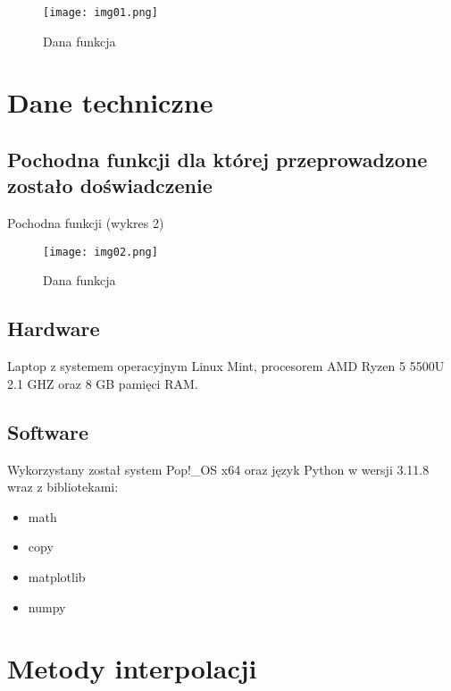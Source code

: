 \documentclass{article}
\begin{document}
\begin{figure}[H]
  \centering
  \begin{minipage}[b]{0.3\textwidth}
    \texttt{[image: img01.png]}
    \caption{Dana funkcja}
  \end{minipage}
\end{figure}

\section{Dane techniczne}

\subsection{Pochodna funkcji dla której przeprowadzone zostało doświadczenie }

Pochodna funkcji (wykres 2)

\begin{figure}[H]
  \centering
  \begin{minipage}[b]{0.3\textwidth}
    \texttt{[image: img02.png]}
    \caption{Dana funkcja}
  \end{minipage}
\end{figure}

\subsection{Hardware}

Laptop z systemem operacyjnym Linux Mint, procesorem AMD Ryzen 5 5500U 2.1 GHZ oraz 8 GB pamięci RAM.

\subsection{Software}

Wykorzystany został system Pop!\_OS x64 oraz język Python w wersji 3.11.8 wraz z bibliotekami:
\begin{itemize}
\item math
\item copy
\item matplotlib
\item numpy
\end{itemize}

\section{Metody interpolacji}
\end{document}
